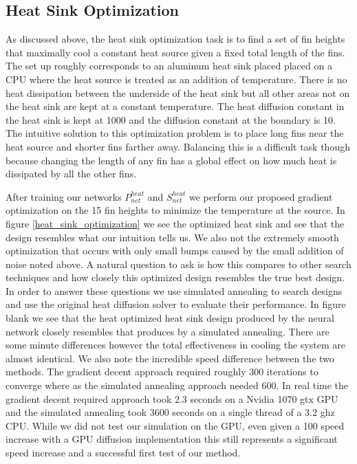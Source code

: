 \documentclass{article} %
\begin{document}
\subsection{Heat Sink Optimization}

As discussed above, the heat sink optimization task is to find a set of fin heights that maximally cool a constant heat source given a fixed total length of the fins. The set up roughly corresponds to an aluminum heat sink placed placed on a CPU where the heat source is treated as an addition of temperature. There is no heat dissipation between the underside of the heat sink but all other areas not on the heat sink are kept at a constant temperature. The heat diffusion constant in the heat sink is kept at 1000 and the diffusion constant at the boundary is 10. The intuitive solution to this optimization problem is to place long fins near the heat source and shorter fins farther away. Balancing this is a difficult task though because changing the length of any fin has a global effect on how much heat is dissipated by all the other fins. 

After training our networks $P^{heat}_{net}$ and $S^{heat}_{net}$ we perform our proposed gradient optimization on the 15 fin heights to minimize the temperature at the source. In figure \ref{heat_sink_optimization} we see the optimized heat sink and see that the design resembles what our intuition tells us. We also not the extremely smooth optimization that occurs with only small bumps caused by the small addition of noise noted above. A natural question to ask is how this compares to other search techniques and how closely this optimized design resembles the true best design. In order to answer these questions we use simulated annealing to search designs and use the original heat diffusion solver to evaluate their performance. In figure blank we see that the heat optimized heat sink design produced by the neural network closely resembles that produces by a simulated annealing. There are some minute differences however the total effectiveness in cooling the system are almost identical. We also note the incredible speed difference between the two methods. The gradient decent approach required roughly 300 iterations to converge where as the simulated annealing approach needed 600. In real time the gradient decent required approach took 2.3 seconds on a Nvidia 1070 gtx GPU and the simulated annealing took 3600 seconds on a single thread of a 3.2 ghz CPU. While we did not test our simulation on the GPU, even given a 100 speed increase with a GPU diffusion implementation this still represents a significant speed increase and a successful first test of our method.
\end{document}
